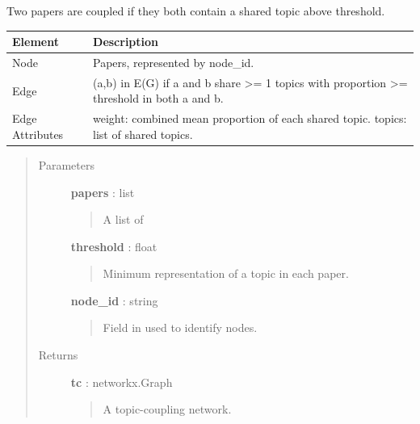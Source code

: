 \documentclass[letterpaper,10pt,english]{sphinxmanual}
\begin{document}
\begin{fulllineitems}
\label{tethne.networks:tethne.networks.papers.topic_coupling}
Two papers are coupled if they both contain a shared topic above threshold.

\begin{tabulary}{\linewidth}{|L|L|}
\hline
\textbf{
Element
} & \textbf{
Description
}\\\hline

Node
 & 
Papers, represented by node\_id.
\\\hline

Edge
 & 
(a,b) in E(G) if a and b share \textgreater{}= 1 topics with
proportion \textgreater{}= threshold in both a and b.
\\\hline

Edge Attributes
 & 
weight: combined mean proportion of each shared topic.
topics: list of shared topics.
\\\hline
\end{tabulary}

\begin{quote}\begin{description}
\item[{Parameters }] \leavevmode
\textbf{papers} : list
\begin{quote}

A list of {\hyperref[tethne:tethne.data.Paper]{}}
\end{quote}

\textbf{threshold} : float
\begin{quote}

Minimum representation of a topic in each paper.
\end{quote}

\textbf{node\_id} : string
\begin{quote}

Field in {\hyperref[tethne:tethne.data.Paper]{}} used to identify nodes.
\end{quote}

\item[{Returns }] \leavevmode
\textbf{tc} : networkx.Graph
\begin{quote}

A topic-coupling network.
\end{quote}

\end{description}\end{quote}

\end{fulllineitems}
\end{document}
